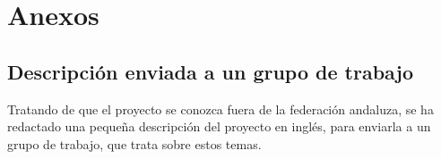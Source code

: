 

\tableofcontents














\chapter{Anexos}
    \section{Descripción enviada a un grupo de trabajo}

    Tratando de que el proyecto se conozca fuera de la federación andaluza,
    se ha redactado una pequeña descripción del proyecto en inglés, para
    enviarla a un grupo de trabajo, que trata sobre estos temas.

